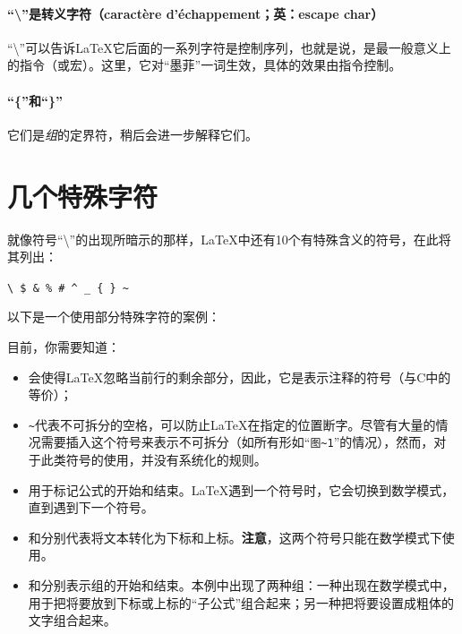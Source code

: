 \paragraph*{“\backslash ”是转义字符（caractère d’échappement；英：escape char）}“\backslash ”可以告诉\LaTeX 它后面的一系列字符是控制序列，也就是说，是最一般意义上的指令（或宏）。这里，它对“墨菲”一词生效，具体的效果由指令控制。

\paragraph*{“\{”和“\}”}它们是\textit{组}的定界符，稍后会进一步解释它们。

\section{几个特殊字符}

就像符号“\backslash”的出现所暗示的那样，\LaTeX 中还有10个有特殊含义的符号，在此将其列出：

\begin{dmd}
    \verb+\ $ & % # ^ _ { } ~+
\end{dmd}


以下是一个使用部分特殊字符的案例：


目前，你需要知道：

\begin{itemize}
    \item \dm{\%}会使得\LaTeX 忽略当前行的剩余部分，因此，它是表示注释的符号（与C中的\dm{//}等价）；
    \item \verb+~+代表不可拆分的空格，可以防止\LaTeX 在指定的位置断字。尽管有大量的情况需要插入这个符号来表示不可拆分（如所有形如“\verb+图~1+”的情况），然而，对于此类符号的使用，并没有系统化的规则。
    \item \dm{\$}用于标记公式的开始和结束。\LaTeX 遇到一个\dm{\$}符号时，它会切换到数学模式，直到遇到下一个\dm{\$}符号。
    \item \dm{\_}和\dm{\^{}}分别代表将文本转化为下标和上标。\textbf{注意}，这两个符号只能在数学模式下使用。
    \item \dm{\{}和\dm{\}}分别表示组的开始和结束。本例中出现了两种组：一种出现在数学模式中，用于把将要放到下标或上标的“子公式”组合起来；另一种把将要设置成粗体的文字组合起来。
\end{itemize}


